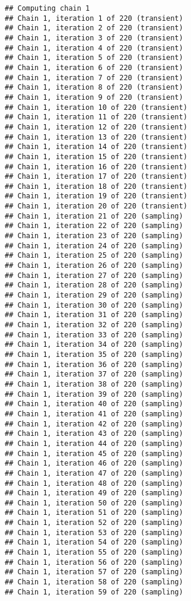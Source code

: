 \documentclass[]{book}
\begin{document}
\begin{verbatim}
## Computing chain 1
## Chain 1, iteration 1 of 220 (transient)
## Chain 1, iteration 2 of 220 (transient)
## Chain 1, iteration 3 of 220 (transient)
## Chain 1, iteration 4 of 220 (transient)
## Chain 1, iteration 5 of 220 (transient)
## Chain 1, iteration 6 of 220 (transient)
## Chain 1, iteration 7 of 220 (transient)
## Chain 1, iteration 8 of 220 (transient)
## Chain 1, iteration 9 of 220 (transient)
## Chain 1, iteration 10 of 220 (transient)
## Chain 1, iteration 11 of 220 (transient)
## Chain 1, iteration 12 of 220 (transient)
## Chain 1, iteration 13 of 220 (transient)
## Chain 1, iteration 14 of 220 (transient)
## Chain 1, iteration 15 of 220 (transient)
## Chain 1, iteration 16 of 220 (transient)
## Chain 1, iteration 17 of 220 (transient)
## Chain 1, iteration 18 of 220 (transient)
## Chain 1, iteration 19 of 220 (transient)
## Chain 1, iteration 20 of 220 (transient)
## Chain 1, iteration 21 of 220 (sampling)
## Chain 1, iteration 22 of 220 (sampling)
## Chain 1, iteration 23 of 220 (sampling)
## Chain 1, iteration 24 of 220 (sampling)
## Chain 1, iteration 25 of 220 (sampling)
## Chain 1, iteration 26 of 220 (sampling)
## Chain 1, iteration 27 of 220 (sampling)
## Chain 1, iteration 28 of 220 (sampling)
## Chain 1, iteration 29 of 220 (sampling)
## Chain 1, iteration 30 of 220 (sampling)
## Chain 1, iteration 31 of 220 (sampling)
## Chain 1, iteration 32 of 220 (sampling)
## Chain 1, iteration 33 of 220 (sampling)
## Chain 1, iteration 34 of 220 (sampling)
## Chain 1, iteration 35 of 220 (sampling)
## Chain 1, iteration 36 of 220 (sampling)
## Chain 1, iteration 37 of 220 (sampling)
## Chain 1, iteration 38 of 220 (sampling)
## Chain 1, iteration 39 of 220 (sampling)
## Chain 1, iteration 40 of 220 (sampling)
## Chain 1, iteration 41 of 220 (sampling)
## Chain 1, iteration 42 of 220 (sampling)
## Chain 1, iteration 43 of 220 (sampling)
## Chain 1, iteration 44 of 220 (sampling)
## Chain 1, iteration 45 of 220 (sampling)
## Chain 1, iteration 46 of 220 (sampling)
## Chain 1, iteration 47 of 220 (sampling)
## Chain 1, iteration 48 of 220 (sampling)
## Chain 1, iteration 49 of 220 (sampling)
## Chain 1, iteration 50 of 220 (sampling)
## Chain 1, iteration 51 of 220 (sampling)
## Chain 1, iteration 52 of 220 (sampling)
## Chain 1, iteration 53 of 220 (sampling)
## Chain 1, iteration 54 of 220 (sampling)
## Chain 1, iteration 55 of 220 (sampling)
## Chain 1, iteration 56 of 220 (sampling)
## Chain 1, iteration 57 of 220 (sampling)
## Chain 1, iteration 58 of 220 (sampling)
## Chain 1, iteration 59 of 220 (sampling)

\end{verbatim}
\end{document}
